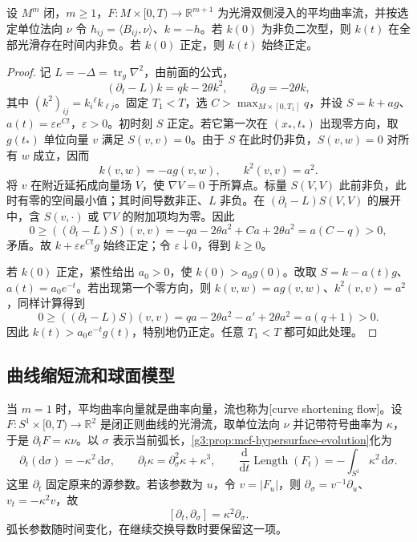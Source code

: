 \begin{theorem}\label{g3:thm:mcf-convexity}
	设 \(M^m\) 闭，\(m\ge1\)，\(F:M\times[0,T)\to\mathbb R^{m+1}\) 为光滑双侧浸入的平均曲率流，并按选定单位法向 \(\nu\) 令 \(h_{ij}=\langle B_{ij},\nu\rangle\)、\(k=-h\)。若 \(k(0)\) 为非负二次型，则 \(k(t)\) 在全部光滑存在时间内非负。若 \(k(0)\) 正定，则 \(k(t)\) 始终正定。
\end{theorem}
\begin{proof}
	记 \(L=-\Delta=\operatorname{tr}_g\nabla^2\)，由前面的公式，
	\[
		(\partial_t-L)k=q k-2\theta k^2,
		\qquad \partial_tg=-2\theta k,
	\]
	其中 \((k^2)_{ij}=k_i{}^\ell k_{\ell j}\)。固定 \(T_1<T\)，选 \(C>\max_{M\times[0,T_1]}q\)，并设
	\(S=k+a g\)、\(a(t)=\varepsilon e^{Ct}\)，\(\varepsilon>0\)。初时刻 \(S\) 正定。若它第一次在 \((x_*,t_*)\) 出现零方向，取 \(g(t_*)\) 单位向量 \(v\) 满足 \(S(v,v)=0\)。由于 \(S\) 在此时仍非负，\(S(v,w)=0\) 对所有 \(w\) 成立，因而
	\[
		k(v,w)=-a g(v,w),\qquad k^2(v,v)=a^2.
	\]
	将 \(v\) 在附近延拓成向量场 \(V\)，使 \(\nabla V=0\) 于所算点。标量 \(S(V,V)\) 此前非负，此时有零的空间最小值；其时间导数非正、\(L\) 非负。在 \((\partial_t-L)S(V,V)\) 的展开中，含 \(S(v,\cdot)\) 或 \(\nabla V\) 的附加项均为零。因此
	\[
		0\ge ((\partial_t-L)S)(v,v)
		=-qa-2\theta a^2+Ca+2\theta a^2
		=a(C-q)>0,
	\]
	矛盾。故 \(k+\varepsilon e^{Ct}g\) 始终正定；令 \(\varepsilon\downarrow0\)，得到 \(k\ge0\)。

	若 \(k(0)\) 正定，紧性给出 \(a_0>0\)，使 \(k(0)>a_0g(0)\)。改取 \(S=k-a(t)g\)、\(a(t)=a_0e^{-t}\)。若出现第一个零方向，则 \(k(v,w)=a g(v,w)\)、\(k^2(v,v)=a^2\)，同样计算得到
	\[
		0\ge ((\partial_t-L)S)(v,v)
		=qa-2\theta a^2-a'+2\theta a^2
		=a(q+1)>0.
	\]
	因此 \(k(t)>a_0e^{-t}g(t)\)，特别地仍正定。任意 \(T_1<T\) 都可如此处理。
\end{proof}

\subsection{曲线缩短流和球面模型}
\label{g3:subsec:2802:04}
当 \(m=1\) 时，平均曲率向量就是曲率向量，流也称为[curve shortening flow]。设 \(F:S^1\times[0,T)\to\mathbb R^2\) 是闭正则曲线的光滑流，取单位法向 \(\nu\) 并记带符号曲率为 \(\kappa\)，于是 \(\partial_tF=\kappa\nu\)。以 \(\sigma\) 表示当前弧长，\cref{g3:prop:mcf-hypersurface-evolution}化为
\begin{equation}\label{g3:eq:curve-shortening-evolution}
	\partial_t(\mathrm d\sigma)=-\kappa^2\,\mathrm d\sigma,
	\qquad \partial_t\kappa=\partial_\sigma^2\kappa+\kappa^3,
	\qquad \frac{\mathrm d}{\mathrm dt}\operatorname{Length}(F_t)
	=-\int_{S^1}\kappa^2\,\mathrm d\sigma.
\end{equation}
这里 \(\partial_t\) 固定原来的源参数。若该参数为 \(u\)，令 \(v=|F_u|\)，则 \(\partial_\sigma=v^{-1}\partial_u\)、\(v_t=-\kappa^2v\)，故
\[
	[\partial_t,\partial_\sigma]=\kappa^2\partial_\sigma.
\]
弧长参数随时间变化，在继续交换导数时要保留这一项。

